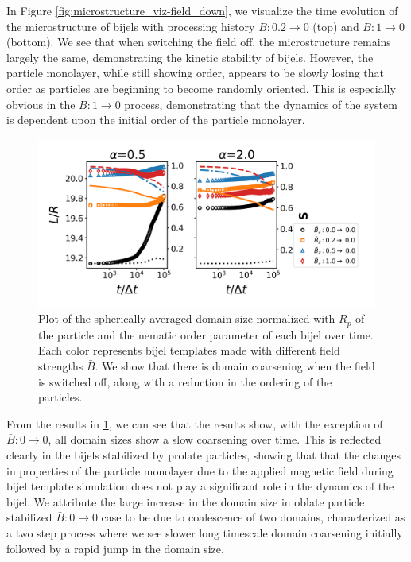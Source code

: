 In Figure \ref{fig:microstructure_viz-field_down}, we visualize the time
evolution of the microstructure of bijels with processing history
\(\bar{B}:0.2 \rightarrow 0\) (top) and \(\bar{B}:1 \rightarrow 0\)
(bottom). We see that when switching the field off, the microstructure
remains largely the same, demonstrating the kinetic stability of bijels.
However, the particle monolayer, while still showing order, appears to
be slowly losing that order as particles are beginning to become
randomly oriented. This is especially obvious in the
\(\bar{B}:1 \rightarrow 0\) process, demonstrating that the dynamics of
the system is dependent upon the initial order of the particle
monolayer.

\begin{figure} 
\centering 
\includegraphics[scale=0.5]{../figures/results/paper2/domain_size-field_down.png} 
\caption{Plot of the spherically averaged domain size normalized with $R_p$ of the particle and the nematic order parameter of each bijel over time. Each color represents bijel templates made with different field strengths $\bar{B}$. We show that there is domain coarsening when the field is switched off, along with a reduction in the ordering of the particles.} 
\label{fig:domain_size-field_down} 
\end{figure}

From the results in \ref{fig:domain_size-field_down}, we can see that
the results show, with the exception of \(\bar{B}: 0\rightarrow 0\), all
domain sizes show a slow coarsening over time. This is reflected clearly
in the bijels stabilized by prolate particles, showing that that the
changes in properties of the particle monolayer due to the applied
magnetic field during bijel template simulation does not play a
significant role in the dynamics of the bijel. We attribute the large
increase in the domain size in oblate particle stabilized
\(\bar{B}: 0\rightarrow 0\) case to be due to coalescence of two
domains, characterized as a two step process where we see slower long
timescale domain coarsening initially followed by a rapid jump in the
domain size.

